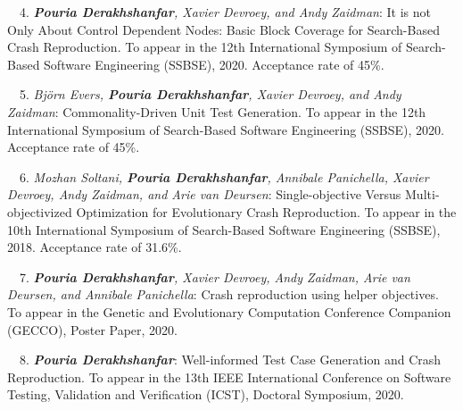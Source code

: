 \begin{etaremune}{\small
    \item[\faFileTextO~\faTrophy~4.] \emph{\textbf{Pouria Derakhshanfar}, Xavier Devroey, and Andy Zaidman}: 
        It is not Only About Control Dependent Nodes: Basic Block Coverage for Search-Based Crash Reproduction.
        To appear in the 12th International Symposium of Search-Based Software Engineering (SSBSE),
        2020. Acceptance rate of 45\%.
}\end{etaremune}


\begin{etaremune}{\small
    \item[\faFileTextO~~5.] \emph{Björn Evers, \textbf{Pouria Derakhshanfar}, Xavier Devroey, and Andy Zaidman}: 
        Commonality-Driven Unit Test Generation.
        To appear in the 12th International Symposium of Search-Based Software Engineering (SSBSE),
        2020. Acceptance rate of 45\%.
}\end{etaremune}

\begin{etaremune}{\small
    \item[~~6.] \emph{Mozhan Soltani, \textbf{Pouria Derakhshanfar}, Annibale Panichella, Xavier Devroey, Andy Zaidman, and Arie van Deursen}: 
    Single-objective Versus Multi-objectivized Optimization for Evolutionary Crash Reproduction.
        To appear in the 10th International Symposium of Search-Based Software Engineering (SSBSE),
        2018. Acceptance rate of 31.6\%.
}\end{etaremune}

\begin{etaremune}{\small
    \item[~~7.] \emph{\textbf{Pouria Derakhshanfar}, Xavier Devroey,  Andy Zaidman, Arie van Deursen, and Annibale Panichella}: 
        Crash reproduction using helper objectives.
        To appear in the  Genetic and Evolutionary Computation Conference Companion (GECCO), Poster Paper,
        2020.
}\end{etaremune}

\begin{etaremune}{\small
    \item[~~8.] \emph{\textbf{Pouria Derakhshanfar}}: 
        Well-informed Test Case Generation and Crash Reproduction.
        To appear in the 13th IEEE International Conference on Software Testing, Validation and Verification (ICST), Doctoral Symposium,
        2020.
}\end{etaremune}


